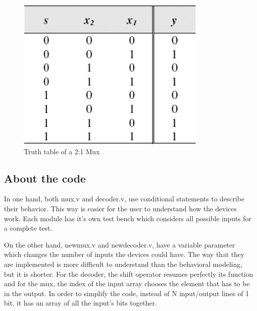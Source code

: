 \begin{figure}[H]
  \begin{centering}
  \includegraphics[scale=1]{data/muxtable.png}
  \par\end{centering}
  \caption{Truth table of a 2:1 Mux}
\end{figure}


\subsection*{About the code}

In one hand, both mux.v and decoder.v, use conditional statements to describe their behavior. This way is easier for the user to understand how the devices work.
Each module has it's own test bench which considers all possible inputs for a complete test.

On the other hand, newmux.v and newdecoder.v, have a variable parameter which changes the number of inputs the devices could have. The way that they are implemented is more difficult to understand than the behavioral modeling, but it is shorter. For the decoder, the shift operator resumes perfectly its function and for the mux, the index of the input array chooses the element that has to be in the output.
In order to simplify the code, instead of N input/output lines of 1 bit, it has an array of all the input's bits together. 
  

